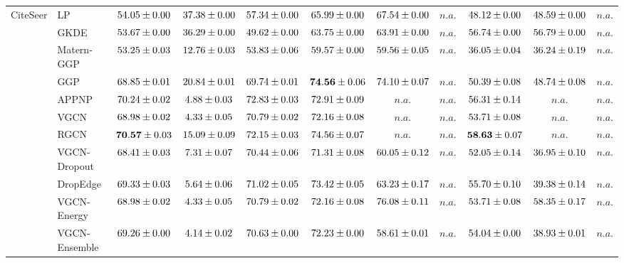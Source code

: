 \begin{table*}[!h]
{\begin{tabular}{ll|cc|cccc|ccc}
        \multirow{14}{*}{CiteSeer} 
        & LP & ${54.05\tiny \pm 0.00}$ & ${37.38\tiny \pm 0.00}$ & ${57.34\tiny \pm 0.00}$ & ${65.99\tiny \pm 0.00}$ & ${67.54\tiny \pm 0.00}$ & $n.a.$ & ${48.12\tiny \pm 0.00}$ & ${48.59\tiny \pm 0.00}$ & $n.a.$\\
        & GKDE & ${53.67\tiny \pm 0.00}$ & ${36.29\tiny \pm 0.00}$ & ${49.62\tiny \pm 0.00}$ & ${63.75\tiny \pm 0.00}$ & ${63.91\tiny \pm 0.00}$ & $n.a.$ & ${56.74\tiny \pm 0.00}$ & ${56.79\tiny \pm 0.00}$ & $n.a.$\\
        & Matern-GGP & ${53.25\tiny \pm 0.03}$ & ${12.76\tiny \pm 0.03}$ & ${53.83\tiny \pm 0.06}$ & ${59.57\tiny \pm 0.00}$ & ${59.56\tiny \pm 0.05}$ & $n.a.$ & ${36.05\tiny \pm 0.04}$ & ${36.24\tiny \pm 0.19}$ & $n.a.$\\
        & GGP & ${68.85\tiny \pm 0.01}$ & ${20.84\tiny \pm 0.01}$ & ${69.74\tiny \pm 0.01}$ & ${\mathbf{74.56}\tiny \pm 0.06}$ & ${74.10\tiny \pm 0.07}$ & $n.a.$ & ${50.39\tiny \pm 0.08}$ & ${48.74\tiny \pm 0.08}$ & $n.a.$\\
        & APPNP & ${70.24\tiny \pm 0.02}$ & ${4.88\tiny \pm 0.03}$ & ${{72.83}\tiny \pm 0.03}$ & ${72.91\tiny \pm 0.09}$ & $n.a.$ & $n.a.$ & ${56.31\tiny \pm 0.14}$ & $n.a.$ & $n.a.$\\
        & VGCN & ${68.98\tiny \pm 0.02}$ & ${4.33\tiny \pm 0.05}$ & ${70.79\tiny \pm 0.02}$ & ${72.16\tiny \pm 0.08}$ & $n.a.$ & $n.a.$ & ${53.71\tiny \pm 0.08}$ & $n.a.$ & $n.a.$\\
        & RGCN & ${\mathbf{70.57}\tiny \pm 0.03}$ & ${15.09\tiny \pm 0.09}$ & ${72.15\tiny \pm 0.03}$ & ${74.56\tiny \pm 0.07}$ & $n.a.$ & $n.a.$ & ${\mathbf{58.63}\tiny \pm 0.07}$ & $n.a.$ & $n.a.$\\
        & VGCN-Dropout & ${68.41\tiny \pm 0.03}$ & ${7.31\tiny \pm 0.07}$ & ${70.44\tiny \pm 0.06}$ & ${71.31\tiny \pm 0.08}$ & ${60.05\tiny \pm 0.12}$ & $n.a.$ & ${52.05\tiny \pm 0.14}$ & ${36.95\tiny \pm 0.10}$ & $n.a.$\\
        & DropEdge & ${69.33\tiny \pm 0.03}$ & ${5.64\tiny \pm 0.06}$ & ${71.02\tiny \pm 0.05}$ & ${73.42\tiny \pm 0.05}$ & ${63.23\tiny \pm 0.17}$ & $n.a.$ & ${55.70\tiny \pm 0.10}$ & ${39.38\tiny \pm 0.14}$ & $n.a.$\\
        & VGCN-Energy & ${68.98\tiny \pm 0.02}$ & ${4.33\tiny \pm 0.05}$ & ${70.79\tiny \pm 0.02}$ & ${72.16\tiny \pm 0.08}$ & ${76.08\tiny \pm 0.11}$ & $n.a.$ & ${53.71\tiny \pm 0.08}$ & ${58.35\tiny \pm 0.17}$ & $n.a.$\\
        & VGCN-Ensemble & ${69.26\tiny \pm 0.00}$ & ${4.14\tiny \pm 0.02}$ & ${70.63\tiny \pm 0.00}$ & ${72.23\tiny \pm 0.00}$ & ${58.61\tiny \pm 0.01}$ & $n.a.$ & ${54.04\tiny \pm 0.00}$ & ${38.93\tiny \pm 0.01}$ & $n.a.$\\

\end{tabular}}
\end{table*}
